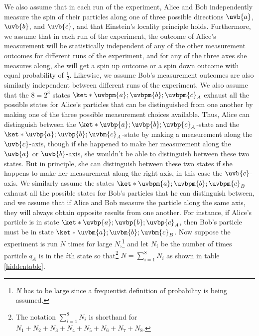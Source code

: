 \documentclass[12pt]{report}
\begin{document}
We also assume that in each run of the experiment, Alice and Bob independently measure the spin of their particles along one of three possible directions $\uvb{a}$, $\uvb{b}$, and $\uvb{c}$, and that Einstein's locality principle holds. Furthermore, we assume that in each run of the experiment, the outcome of Alice's measurement will be statistically independent of any of the other measurement outcomes for different runs of the experiment, and for any of the three axes she measures along, she will get a spin up outcome or a spin down outcome with equal probability of $\frac{1}{2}.$ Likewise, we assume Bob's measurement outcomes are also similarly independent between different runs of the experiment. We also assume that the $8=2^3$ states $\ket*{\uvbpm{a};\uvbpm{b};\uvbpm{c}}_A$ exhaust all the possible states for Alice's particles that can be distinguished from one another by making one of the three possible measurement choices available. Thus, Alice can distinguish between the $\ket*{\uvbp{a};\uvbp{b};\uvbp{c}}_A$-state and the $\ket*{\uvbp{a};\uvbp{b};\uvbm{c}}_A$-state by making a measurement along the $\uvb{c}$-axis, though if she happened to make her measurement along the $\uvb{a}$ or $\uvb{b}$-axis, she wouldn't be able to distinguish between these two states. But in principle, she can distinguish between these two states if she happens to make her measurement along the right axis, in this case the $\uvb{c}$-axis. We similarly assume the states $\ket*{\uvbpm{a};\uvbpm{b};\uvbpm{c}}_B$  exhaust all the possible states for Bob's particles that he can distinguish between, and we assume that if Alice and Bob measure the particle along the same axis, they will always obtain opposite results from one another. For instance, if Alice's particle is in state $\ket*{\uvbp{a};\uvbp{b};\uvbp{c}}_A$, then Bob's particle must be in state $\ket*{\uvbm{a};\uvbm{b};\uvbm{c}}_B$. Now suppose the experiment is run $N$ times for large $N$,\footnote{$N$ has to be large since a frequentist definition of probability is being assumed.} and let $N_i$ be the number of times particle $q_A$ is in the $i$th state so that\footnote{The notation $\sum_{i=1}^8 N_i$ is shorthand for $N_1+N_2+N_3+N_4+N_5+N_6+N_7+N_8$.  %
%
} $N=\sum_{i=1}^8 N_i$ as shown in table \ref{hiddentable}.
      
\end{document}
